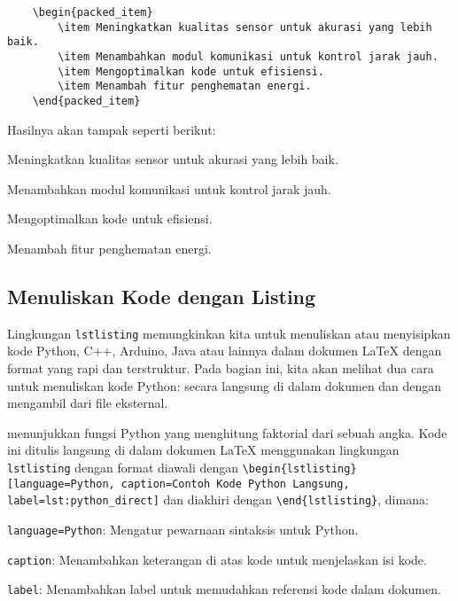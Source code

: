\begin{lstlisting}
    \begin{packed_item}
        \item Meningkatkan kualitas sensor untuk akurasi yang lebih baik.
        \item Menambahkan modul komunikasi untuk kontrol jarak jauh.
        \item Mengoptimalkan kode untuk efisiensi.
        \item Menambah fitur penghematan energi.
    \end{packed_item}
\end{lstlisting}

Hasilnya akan tampak seperti berikut:
\begin{packed_item}
    \item Meningkatkan kualitas sensor untuk akurasi yang lebih baik.
    \item Menambahkan modul komunikasi untuk kontrol jarak jauh.
    \item Mengoptimalkan kode untuk efisiensi.
    \item Menambah fitur penghematan energi.
\end{packed_item}

\subsection{Menuliskan Kode dengan Listing}
Lingkungan \texttt{lstlisting} memungkinkan kita untuk menuliskan atau menyisipkan kode Python, C++, Arduino, Java atau lainnya dalam dokumen LaTeX dengan format yang rapi dan terstruktur. Pada bagian ini, kita akan melihat dua cara untuk menuliskan kode Python: secara langsung di dalam dokumen dan dengan mengambil dari file eksternal.

 menunjukkan fungsi Python yang menghitung faktorial dari sebuah angka. Kode ini ditulis langsung di dalam dokumen LaTeX menggunakan lingkungan \texttt{lstlisting} dengan format diawali dengan \texttt{\textbackslash begin\{lstlisting\}[language=Python, caption=Contoh Kode Python Langsung, label=lst:python\_direct]} dan diakhiri dengan \texttt{\textbackslash end\{lstlisting\}}, dimana:
\begin{packed_item}
    \item \texttt{language=Python}: Mengatur pewarnaan sintaksis untuk Python.
    \item \texttt{caption}: Menambahkan keterangan di atas kode untuk menjelaskan isi kode.
    \item \texttt{label}: Menambahkan label untuk memudahkan referensi kode dalam dokumen.
\end{packed_item}

